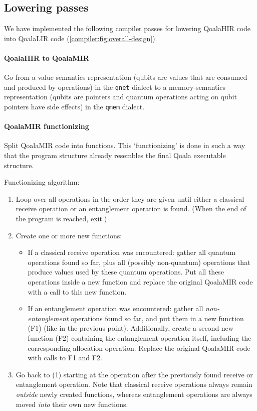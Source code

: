 \subsection{Lowering passes}
We have implemented the following compiler passes for lowering QoalaHIR code into QoalaLIR code (\cref{compiler:fig:overall-design}).

\paragraph{QoalaHIR to QoalaMIR}
Go from a value-semantics representation (qubits are values that are consumed and produced by operations) in the \texttt{qnet} dialect to a memory-semantics representation (qubits are pointers and quantum operations acting on qubit pointers have side effects) in the \texttt{qmem} dialect.

\paragraph{QoalaMIR functionizing}
Split QoalaMIR code into functions.
This `functionizing' is done in such a way that the program structure already resembles the final Qoala executable structure.

Functionizing algorithm:
\begin{enumerate}
\item Loop over all operations in the order they are given until either a classical receive operation or an entanglement operation is found. (When the end of the program is reached, exit.)
\item Create one or more new functions:
    \begin{itemize}
        \item If a classical receive operation was encountered: gather all quantum operations found so far, plus all (possibly non-quantum) operations that produce values used by these quantum operations.
        Put all these operations inside a new function and replace the original QoalaMIR code with a call to this new function.
        \item If an entanglement operation was encountered: gather all \emph{non-entanglement} operations found so far, and put them in a new function (F1) (like in the previous point).
        Additionally, create a second new function (F2) containing the entanglement operation itself, including the corresponding allocation operation. Replace the original QoalaMIR code with calls to F1 and F2.
    \end{itemize}
\item Go back to (1) starting at the operation after the previously found receive or entanglement operation. Note that classical receive operations always remain \emph{outside} newly created functions, whereas entanglement operations are always moved \emph{into} their own new functions.
\end{enumerate}

